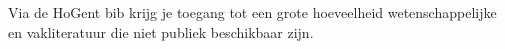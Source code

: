 Via de HoGent bib krijg je toegang tot een grote hoeveelheid wetenschappelijke en vakliteratuur die niet publiek beschikbaar zijn.
%
%
%
%


